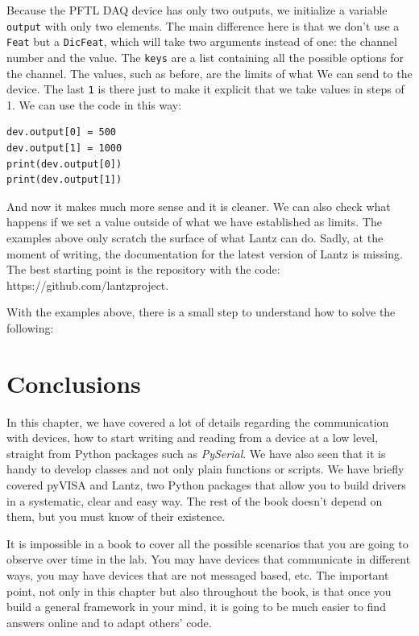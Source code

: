 Because the {PFTL DAQ} device has only two outputs, we initialize a variable \texttt{output} with only two elements. The main difference here is that we don't use a \texttt{Feat} but a \texttt{DicFeat}, which will take two arguments instead of one: the channel number and the value. The \texttt{keys} are a list containing all the possible options for the channel. The values, such as before, are the limits of what We can send to the device. The last \texttt{1} is there just to make it explicit that we take values in steps of 1. We can use the code in this way:

\begin{verbatim}
dev.output[0] = 500
dev.output[1] = 1000
print(dev.output[0])
print(dev.output[1])
\end{verbatim}

And now it makes much more sense and it is cleaner. We can also check what happens if we set a value outside of what we have established as limits. The examples above only scratch the surface of what Lantz can do. Sadly, at the moment of writing, the documentation for the latest version of Lantz is missing. The best starting point is the repository with the code: https://github.com/lantzproject.

With the examples above, there is a small step to understand how to solve the following:


\section{Conclusions}\label{section:conclusions}
In this chapter, we have covered a lot of details regarding the communication with devices, how to start writing and reading from a device at a low level, straight from Python packages such as \emph{PySerial}. We have also seen that it is handy to develop classes and not only plain functions or scripts. We have briefly covered pyVISA and Lantz, two Python packages that allow you to build drivers in a systematic, clear and easy way. The rest of the book doesn't depend on them, but you must know of their existence.

It is impossible in a book to cover all the possible scenarios that you are going to observe over time in the lab. You may have devices that communicate in different ways, you may have devices that are not messaged based, etc. The important point, not only in this chapter but also throughout the book, is that once you build a general framework in your mind, it is going to be much easier to find answers online and to adapt others' code.

